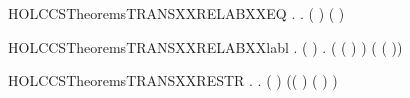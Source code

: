 \begin{SaveVerbatim}{HOLCCSTheoremsTRANSXXRELABXXEQ}
\HOLTokenTurnstile{} \HOLSymConst{\HOLTokenForall{}}   .
          \HOLTokenTransBegin{}\HOLTokenTransEnd {} \HOLSymConst{\HOLTokenEquiv{}}
       \HOLSymConst{\HOLTokenExists{}} .
           ( \HOLSymConst{=}   ) \HOLSymConst{\HOLTokenConj{}} ( \HOLSymConst{=}   ) \HOLSymConst{\HOLTokenConj{}}
            \HOLTokenTransBegin{}\HOLTokenTransEnd {}
\end{SaveVerbatim}
\newcommand{\HOLCCSTheoremsTRANSXXRELABXXEQ}{\UseVerbatim{HOLCCSTheoremsTRANSXXRELABXXEQ}}
\begin{SaveVerbatim}{HOLCCSTheoremsTRANSXXRELABXXlabl}
\HOLTokenTurnstile{} \HOLSymConst{\HOLTokenForall{}}   .
         ( ) \HOLTokenTransBegin{}\HOLTokenTransEnd {} \HOLSymConst{\HOLTokenImp{}}
       \HOLSymConst{\HOLTokenExists{}} .
           ( \HOLSymConst{=}  ( ) ) \HOLSymConst{\HOLTokenConj{}}
           ( \HOLSymConst{=}   ( )) \HOLSymConst{\HOLTokenConj{}}  \HOLTokenTransBegin{}\HOLTokenTransEnd {}
\end{SaveVerbatim}
\newcommand{\HOLCCSTheoremsTRANSXXRELABXXlabl}{\UseVerbatim{HOLCCSTheoremsTRANSXXRELABXXlabl}}
\begin{SaveVerbatim}{HOLCCSTheoremsTRANSXXRESTR}
\HOLTokenTurnstile{} \HOLSymConst{\HOLTokenForall{}}   .
       \HOLConst{\ensuremath{\nu}}   \HOLTokenTransBegin{}\HOLTokenTransEnd {} \HOLSymConst{\HOLTokenImp{}}
       \HOLSymConst{\HOLTokenExists{}} .
           ( \HOLSymConst{=} \HOLConst{\ensuremath{\nu}}  ) \HOLSymConst{\HOLTokenConj{}}  \HOLTokenTransBegin{}\HOLTokenTransEnd {} \HOLSymConst{\HOLTokenConj{}}
           (( \HOLSymConst{=} \HOLConst{\ensuremath{\tau}}) \HOLSymConst{\HOLTokenDisj{}} ( \HOLSymConst{=}  ) \HOLSymConst{\HOLTokenConj{}}  \HOLConst{\HOLTokenNotIn{}}  \HOLSymConst{\HOLTokenConj{}}   \HOLConst{\HOLTokenNotIn{}} )
\end{SaveVerbatim}
